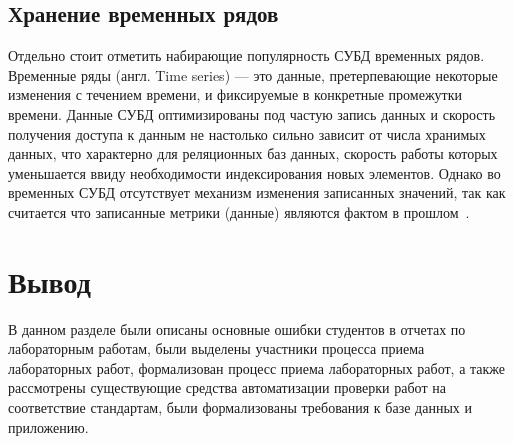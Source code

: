\subsection{Хранение временных рядов}
Отдельно стоит отметить набирающие популярность СУБД временных рядов. Временные ряды (англ. Time series) --- это данные, 
претерпевающие некоторые изменения с течением 
времени, и фиксируемые в конкретные промежутки 
времени. Данные СУБД оптимизированы под частую запись данных и скорость получения доступа к данным не настолько сильно зависит от числа хранимых данных, что характерно для реляционных баз данных, скорость работы которых уменьшается ввиду необходимости индексирования новых элементов. Однако во временных СУБД отсутствует механизм изменения записанных значений, так как считается что записанные метрики (данные) являются фактом в прошлом~\cite{time_db}.

\section*{Вывод}
В данном разделе были описаны основные ошибки студентов в отчетах по лабораторным работам, были выделены участники процесса приема лабораторных работ, формализован процесс приема лабораторных работ, а также рассмотрены существующие средства автоматизации проверки работ на соответствие стандартам, были формализованы требования к базе данных и приложению. 

